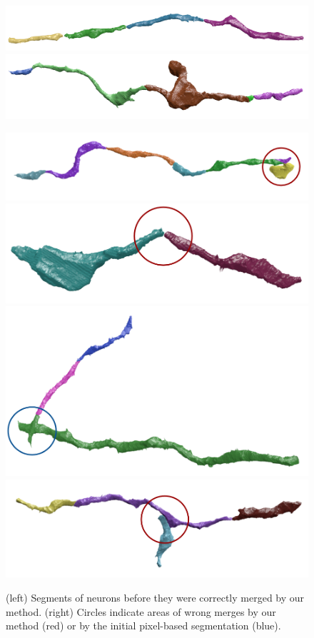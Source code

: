 \begin{figure}[t]
\begin{minipage}{0.45\linewidth}
		\includegraphics[width=0.85\linewidth]{./figures/VI-results/multicut-correct4.png}
		\includegraphics[width=0.85\linewidth]{./figures/VI-results/multicut-correct5.png}
	\end{minipage}
	\begin{minipage}{0.45\linewidth}
		\centering
		\includegraphics[width=0.85\linewidth]{./figures/VI-results/multicut-incorrect1.png}
		\includegraphics[width=0.85\linewidth]{./figures/VI-results/multicut-incorrect2.png}
		\includegraphics[width=0.85\linewidth]{./figures/VI-results/multicut-incorrect3.png}
		\includegraphics[width=0.85\linewidth]{./figures/VI-results/multicut-incorrect4.png}
	\end{minipage}
	\caption{(left) Segments of neurons before they were correctly merged by our method. (right) Circles indicate areas of wrong merges by our method (red) or by the initial pixel-based segmentation (blue).}
	\label{fig:qualitative-results}
\end{figure}

